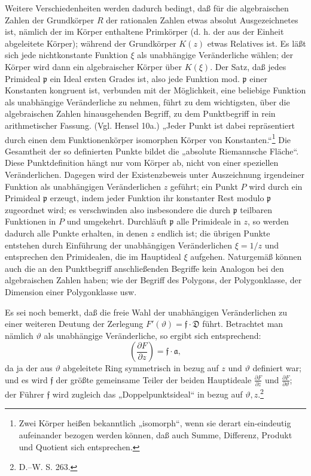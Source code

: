 \documentclass[11pt]{article}
\providecommand{\p}{\partial}
\providecommand{\frp}{\mathfrak p}
\providecommand{\fra}{\mathfrak a}
\providecommand{\frf}{\mathfrak f}
\providecommand{\frD}{\mathfrak D}
\providecommand{\p}{\partial}
\begin{document}
Weitere Verschiedenheiten werden dadurch bedingt, daß für die algebraischen Zahlen der Grundkörper \(R\) der rationalen Zahlen etwas absolut Ausgezeichnetes ist, nämlich der im Körper enthaltene Primkörper (d. h. der aus der Einheit abgeleitete Körper); während der Grundkörper \(K(z)\) etwas Relatives ist. Es läßt sich jede nichtkonstante Funktion \(\xi\) als unabhängige Veränderliche wählen; der Körper wird dann ein algebraischer Körper über \(K(\xi)\). Der Satz, daß jedes Primideal \(\frp\) ein Ideal ersten Grades ist, also jede Funktion mod. \(\frp\) einer Konstanten kongruent ist, verbunden mit der Möglichkeit, eine beliebige Funktion als unabhängige Veränderliche zu nehmen, führt zu dem wichtigsten, über die algebraischen Zahlen hinausgehenden Begriff, zu dem Punktbegriff in rein arithmetischer Fassung. (Vgl. Hensel 10a.) „Jeder Punkt ist dabei repräsentiert durch einen dem Funktionenkörper isomorphen Körper von Konstanten.“\footnote{Zwei Körper heißen bekanntlich „isomorph“, wenn sie derart ein-eindeutig aufeinander bezogen werden können, daß auch Summe, Differenz, Produkt und Quotient sich entsprechen.} Die Gesamtheit der so definierten Punkte bildet die „absolute Riemannsche Fläche“. Diese Punktdefinition hängt nur vom Körper ab, nicht von einer speziellen Veränderlichen. Dagegen wird der Existenzbeweis unter Auszeichnung irgendeiner Funktion als unabhängigen Veränderlichen \(z\) geführt; ein Punkt \(P\) wird durch ein Primideal \(\frp\) erzeugt, indem jeder Funktion ihr konstanter Rest modulo \(\frp\) zugeordnet wird; es verschwinden also insbesondere die durch \(\frp\) teilbaren Funktionen in \(P\) und umgekehrt. Durchläuft \(\frp\) alle Primideale in \(z\), so werden dadurch alle Punkte erhalten, in denen \(z\) endlich ist; die übrigen Punkte entstehen durch Einführung der unabhängigen Veränderlichen \(\xi=1/z\) und entsprechen den Primidealen, die im Hauptideal \(\xi\) aufgehen. Naturgemäß können auch die an den Punktbegriff anschließenden Begriffe kein Analogon bei den algebraischen Zahlen haben; wie der Begriff des Polygons, der Polygonklasse, der Dimension einer Polygonklasse usw.


Es sei noch bemerkt, daß die freie Wahl der unabhängigen Veränderlichen zu einer weiteren Deutung der Zerlegung \(F'(\vartheta)=\frf\cdot\frD\) führt. Betrachtet man nämlich \(\vartheta\) als unabhängige Veränderliche, so ergibt sich entsprechend:
\[
\left(\frac{\p F}{\p z}\right)=\frf\cdot\fra,
\]
da ja der aus \(\vartheta\) abgeleitete Ring symmetrisch in bezug auf \(z\) und \(\vartheta\) definiert war; und es wird \(\frf\) der größte gemeinsame Teiler der beiden Hauptideale \(\frac{\p F}{\p z}\) und \(\frac{\p F}{\p\vartheta}\); der Führer \(\frf\) wird zugleich das „Doppelpunktsideal“ in bezug auf \(\vartheta,z\).\footnote{D.--W. S. 263.}
\end{document}
